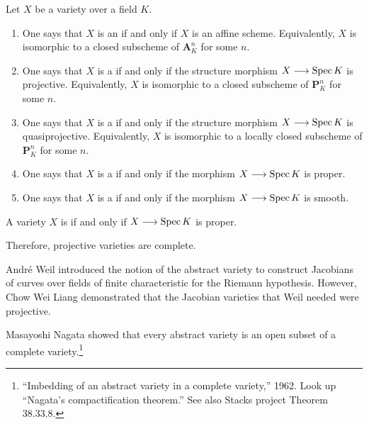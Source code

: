 \documentclass [11 pt, oneside] {article}
\begin{document}
\begin{definition}\label{}\text{}
Let $X$ be a variety over a field $K$.
\begin{enumerate}
	\item One says that $X$ is an  if and only if $X$ is an affine scheme. Equivalently, $X$ is isomorphic to a closed subscheme of $\mathbf{A}^n_K$ for some $n$.
	\item One says that $X$ is a  if and only if the structure morphism $X\longrightarrow \operatorname{Spec} K$ is projective. Equivalently, $X$ is isomorphic to a closed subscheme of $\mathbf{P}^n_K$ for some $n$.
	\item One says that $X$ is a  if and only if the structure morphism $X\longrightarrow \operatorname{Spec} K$ is quasiprojective. Equivalently, $X$ is isomorphic to a locally closed subscheme of $\mathbf{P}^n_K$ for some $n$.
	\item One says that $X$ is a  if and only if the morphism $X\longrightarrow \operatorname{Spec} K$ is proper.
	\item One says that $X$ is a  if and only if the morphism $X\longrightarrow \operatorname{Spec} K$ is smooth.
\end{enumerate}
\end{definition}

\begin{definition}[ ]\label{}\text{}
A variety $X$ is  if and only if $X\longrightarrow \operatorname{Spec} K$ is proper.
\end{definition}

\begin{remark}
	Therefore, projective varieties are complete.
\end{remark}

Andr\'e Weil introduced the notion of the abstract variety to construct Jacobians of curves over fields of finite characteristic for the Riemann hypothesis. However, Chow Wei Liang demonstrated that the Jacobian varieties that Weil needed were projective. 

Masayoshi Nagata showed that every abstract variety is an open subset of a complete variety.\footnote{``Imbedding of an abstract variety in a complete variety,'' 1962. Look up ``Nagata's compactification theorem.'' See also Stacks project Theorem 38.33.8.}
\end{document}
